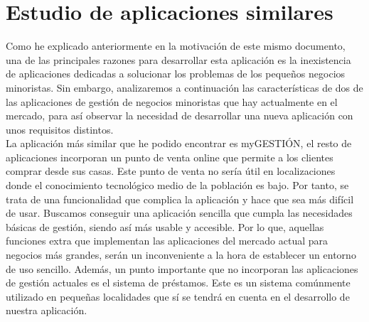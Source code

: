 \chapter{Estudio de aplicaciones similares}
\label{chap:Apps}

Como he explicado anteriormente en la motivación de este mismo documento, una de las principales razones para desarrollar esta aplicación es la inexistencia de aplicaciones dedicadas a solucionar los problemas de los pequeños negocios minoristas. Sin embargo, analizaremos a continuación las características de dos de las aplicaciones de gestión de negocios minoristas que hay actualmente en el mercado, para así observar la necesidad de desarrollar una nueva aplicación con unos requisitos distintos. \\

La aplicación más similar que he podido encontrar es myGESTIÓN, el resto de aplicaciones incorporan un punto de venta online que permite a los clientes comprar desde sus casas. Este punto de venta no sería útil en localizaciones donde el conocimiento tecnológico medio de la población es bajo. Por tanto, se trata de una funcionalidad que complica la aplicación y hace que sea más difícil de usar. Buscamos conseguir una aplicación sencilla que cumpla las necesidades básicas de gestión, siendo así más usable y accesible. Por lo que, aquellas funciones extra que implementan las aplicaciones del mercado actual para negocios más grandes, serán un inconveniente a la hora de establecer un entorno de uso sencillo. Además, un punto importante que no incorporan las aplicaciones de gestión actuales es el sistema de préstamos. Este es un sistema comúnmente utilizado en pequeñas localidades que sí se tendrá en cuenta en el desarrollo de nuestra aplicación. 


